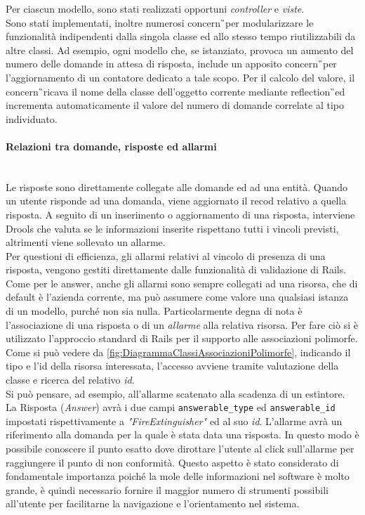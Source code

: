 Per ciascun modello, sono stati realizzati opportuni \textit{controller} e \textit{viste}. \\
Sono stati implementati, inoltre numerosi \gls{concern}\G\ per modularizzare le funzionalità indipendenti dalla singola classe ed allo stesso tempo riutilizzabili da altre classi. Ad esempio, ogni modello che, se istanziato, provoca un aumento del numero delle domande in attesa di risposta, include un apposito \gls{concern}\G\ per l'aggiornamento di un contatore dedicato a tale scopo. Per il calcolo del valore, il \gls{concern}\G\ ricava il nome della classe dell'oggetto corrente mediante \gls{reflection}\G\ ed incrementa automaticamente il valore del numero di domande correlate al tipo individuato.\\

\paragraph*{Relazioni tra domande, risposte ed allarmi}\mbox{} \\
Le risposte sono direttamente collegate alle domande ed ad una entità. Quando un utente risponde ad una domanda, viene aggiornato il recod relativo a quella risposta. A seguito di un inserimento o aggiornamento di una risposta, interviene Drools che valuta se le informazioni inserite rispettano tutti i vincoli previsti, altrimenti viene sollevato un allarme. \\ Per questioni di efficienza, gli allarmi relativi al vincolo di presenza  di una risposta, vengono gestiti direttamente dalle funzionalità di validazione di Rails.\\
Come per le answer, anche gli allarmi sono sempre collegati ad una risorsa, che di default è l'azienda corrente, ma può assumere come valore una qualsiasi istanza di un modello, purché non sia nulla.
Particolarmente degna di nota è l'associazione di una risposta o di un \textit{allarme} alla relativa risorsa. Per fare ciò si è utilizzato l'approccio standard di Rails per il supporto alle associazioni polimorfe. \\  Come si può vedere da  \autoref{fig:DiagrammaClassiAssociazioniPolimorfe}, indicando il tipo e l'id della risorsa interessata, l'accesso avviene tramite valutazione della classe e ricerca del relativo \textit{id}. \\
Si può pensare, ad esempio, all'allarme scatenato alla scadenza di un estintore. \\
La Risposta (\textit{Answer}) avrà i due campi \texttt{answerable\_type} ed \texttt{answerable\_id} impostati rispettivamente a \textit{"FireExtinguisher"} ed al suo \textit{id}.  L'allarme avrà un riferimento alla domanda per la quale è stata data una risposta. In questo modo è possibile conoscere il punto esatto dove dirottare l'utente al click sull'allarme per raggiungere il punto di non conformità. Questo aspetto è stato considerato di fondamentale importanza poiché la mole delle informazioni nel software è molto grande, è quindi necessario fornire il maggior numero di strumenti possibili all'utente per facilitarne la navigazione e l'orientamento nel sistema.

